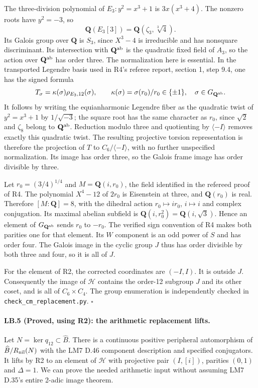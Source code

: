 The three-division polynomial of $E_3:y^2=x^3+1$ is
$3x(x^3+4)$. The nonzero roots have $y^2=-3$, so
\[
 \mathbf Q(E_3[3])=\mathbf Q(\zeta_3,\sqrt[3]4).
\]
Its Galois group over $\mathbf Q$ is $S_3$, since $X^3-4$ is
irreducible and has nonsquare discriminant. Its intersection
with $\mathbf Q^{\rm ab}$ is the quadratic fixed field of
$A_3$, so the action over $\mathbf Q^{\rm ab}$ has order three.
The normalization here is essential. In the transported Legendre
basis used in R4's referee report, section 1, step 9.4, one has the
signed formula
\[
 T_\sigma=\kappa(\sigma)\rho_{E_3,12}(\sigma),\qquad
 \kappa(\sigma)=\sigma(r_0)/r_0\in\{\pm1\},
 \quad \sigma\in G_{\mathbf Q^{\rm ab}}.
\]
It follows by writing the equianharmonic Legendre fiber as the
quadratic twist of $y^2=x^3+1$ by $1/\sqrt{-3}$; the square root
has the same character as $r_0$, since $\sqrt2$ and $\zeta_8$
belong to $\mathbf Q^{\rm ab}$. Reduction modulo three and
quotienting by $\langle-I\rangle$ removes exactly this quadratic
twist. The resulting projective torsion representation is therefore
the projection of $T$ to $C_6/\langle-I\rangle$, with no further
unspecified normalization. Its image has order three, so the
Galois frame image has order divisible by three.

Let $r_0=(3/4)^{1/4}$ and $M=\mathbf Q(i,r_0)$, the field
identified in the refereed proof of R4. The polynomial
$X^4-12$ of $2r_0$ is Eisenstein at three, and
$\mathbf Q(r_0)$ is real. Therefore $[M:\mathbf Q]=8$, with
the dihedral action $r_0\mapsto i r_0$, $i\mapsto i$ and
complex conjugation. Its maximal abelian subfield is
$\mathbf Q(i,r_0^2)=\mathbf Q(i,\sqrt3)$. Hence an element of
$G_{\mathbf Q^{\rm ab}}$ sends $r_0$ to $-r_0$. The verified
sign convention of R4 makes both parities one for that element.
Its $W$ component is an odd power of $S$ and has order four.
The Galois image in the cyclic group $J$ thus has order divisible
by both three and four, so it is all of $J$.

For the element of R2, the corrected coordinates are $(-I,I)$.
It is outside $J$. Consequently the image of $\mathcal H$
contains the order-12 subgroup $J$ and its other coset, and is
all of $C_6\times C_4$. The group enumeration is independently
checked in \texttt{check\_cm\_replacement.py}. \hfill$\square$

\paragraph{LB.5 (Proved, using R2): the arithmetic replacement lifts.}
Let $N=\ker q_{12}\subset\widehat B$. There is a continuous
positive peripheral automorphism of
$\widehat B/R_{\rm nil}(N)$ with the LM7 D.46 component
description and specified conjugators. It lifts by R2 to an
element of $\mathcal H$ with projective pair $(I,[i])$, parities
$(0,1)$ and $\Delta=1$. We can prove the needed arithmetic
input without assuming LM7 D.35's entire 2-adic image theorem.

